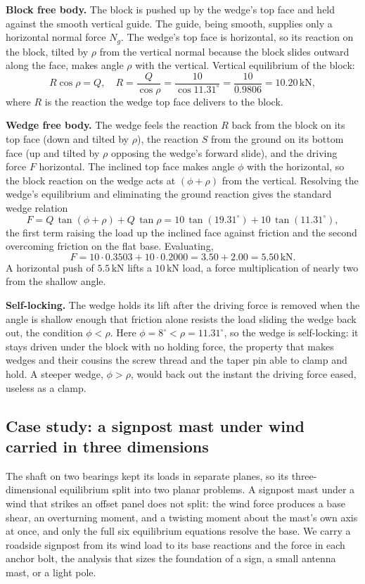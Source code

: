 \textbf{Block free body.} The block is pushed up by the wedge's top face and
held against the smooth vertical guide. The guide, being smooth, supplies only
a horizontal normal force $N_g$. The wedge's top face is horizontal, so its
reaction on the block, tilted by $\rho$ from the vertical normal because the
block slides outward along the face, makes angle $\rho$ with the vertical.
Vertical equilibrium of the block:
\[
R\cos\rho = Q, \quad R = \frac{Q}{\cos\rho} = \frac{10}{\cos 11.31^{\circ}}
= \frac{10}{0.9806} = 10.20\,\text{kN},
\]
where $R$ is the reaction the wedge top face delivers to the block.

\textbf{Wedge free body.} The wedge feels the reaction $R$ back from the block
on its top face (down and tilted by $\rho$), the reaction $S$ from the ground
on its bottom face (up and tilted by $\rho$ opposing the wedge's forward
slide), and the driving force $F$ horizontal. The inclined top face makes angle
$\phi$ with the horizontal, so the block reaction on the wedge acts at
$(\phi + \rho)$ from the vertical. Resolving the wedge's equilibrium and
eliminating the ground reaction gives the standard wedge relation
\[
F = Q\,\tan(\phi + \rho) + Q\,\tan\rho
= 10\,\tan(19.31^{\circ}) + 10\,\tan(11.31^{\circ}),
\]
the first term raising the load up the inclined face against friction and the
second overcoming friction on the flat base. Evaluating,
\[
F = 10 \cdot 0.3503 + 10 \cdot 0.2000 = 3.50 + 2.00 = 5.50\,\text{kN}.
\]
A horizontal push of $5.5\,\text{kN}$ lifts a $10\,\text{kN}$ load, a force
multiplication of nearly two from the shallow angle.

\textbf{Self-locking.} The wedge holds its lift after the driving force is
removed when the angle is shallow enough that friction alone resists the load
sliding the wedge back out, the condition $\phi < \rho$. Here
$\phi = 8^{\circ} < \rho = 11.31^{\circ}$, so the wedge is self-locking: it
stays driven under the block with no holding force, the property that makes
wedges and their cousins the screw thread and the taper pin able to clamp and
hold. A steeper wedge, $\phi > \rho$, would back out the instant the driving
force eased, useless as a clamp.

\subsection{Case study: a signpost mast under wind carried in three dimensions}

The shaft on two bearings kept its loads in separate planes, so its
three-dimensional equilibrium split into two planar problems. A signpost mast
under a wind that strikes an offset panel does not split: the wind force
produces a base shear, an overturning moment, and a twisting moment about the
mast's own axis at once, and only the full six equilibrium equations resolve
the base. We carry a roadside signpost from its wind load to its base
reactions and the force in each anchor bolt, the analysis that sizes the
foundation of a sign, a small antenna mast, or a light pole.

